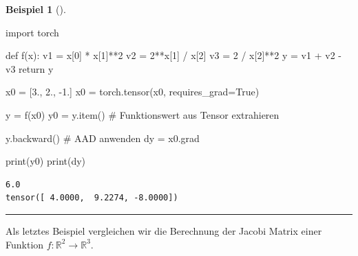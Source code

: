 \documentclass[
  a4paper,
  DIV=11]{scrreprt}
\newenvironment{Shaded}{\begin{snugshade}}{\end{snugshade}}
\newcommand{\BuiltInTok}[1]{\textcolor[rgb]{0.00,0.23,0.31}{#1}}
\newcommand{\CommentTok}[1]{\textcolor[rgb]{0.37,0.37,0.37}{#1}}
\newcommand{\ControlFlowTok}[1]{\textcolor[rgb]{0.00,0.23,0.31}{#1}}
\newcommand{\DecValTok}[1]{\textcolor[rgb]{0.68,0.00,0.00}{#1}}
\newcommand{\FloatTok}[1]{\textcolor[rgb]{0.68,0.00,0.00}{#1}}
\newcommand{\ImportTok}[1]{\textcolor[rgb]{0.00,0.46,0.62}{#1}}
\newcommand{\KeywordTok}[1]{\textcolor[rgb]{0.00,0.23,0.31}{#1}}
\newcommand{\NormalTok}[1]{\textcolor[rgb]{0.00,0.23,0.31}{#1}}
\newcommand{\OperatorTok}[1]{\textcolor[rgb]{0.37,0.37,0.37}{#1}}
\newcommand{\VariableTok}[1]{\textcolor[rgb]{0.07,0.07,0.07}{#1}}
\theoremstyle{definition}
\theoremstyle{definition}
\newtheorem{example}{Beispiel}[chapter]
\theoremstyle{remark}
\begin{document}
\begin{example}[]
\begin{Shaded}
\begin{Highlighting}[]
\ImportTok{import}\NormalTok{ torch}

\KeywordTok{def}\NormalTok{ f(x):}
\NormalTok{    v1 }\OperatorTok{=}\NormalTok{ x[}\DecValTok{0}\NormalTok{] }\OperatorTok{*}\NormalTok{ x[}\DecValTok{1}\NormalTok{]}\OperatorTok{**}\DecValTok{2}
\NormalTok{    v2 }\OperatorTok{=} \DecValTok{2}\OperatorTok{**}\NormalTok{x[}\DecValTok{1}\NormalTok{] }\OperatorTok{/}\NormalTok{ x[}\DecValTok{2}\NormalTok{]}
\NormalTok{    v3 }\OperatorTok{=} \DecValTok{2} \OperatorTok{/}\NormalTok{ x[}\DecValTok{2}\NormalTok{]}\OperatorTok{**}\DecValTok{2}
\NormalTok{    y }\OperatorTok{=}\NormalTok{ v1 }\OperatorTok{+}\NormalTok{ v2 }\OperatorTok{{-}}\NormalTok{ v3}
    \ControlFlowTok{return}\NormalTok{ y}

\NormalTok{x0 }\OperatorTok{=}\NormalTok{ [}\FloatTok{3.}\NormalTok{, }\FloatTok{2.}\NormalTok{, }\OperatorTok{{-}}\FloatTok{1.}\NormalTok{]}
\NormalTok{x0 }\OperatorTok{=}\NormalTok{ torch.tensor(x0, requires\_grad}\OperatorTok{=}\VariableTok{True}\NormalTok{)}

\NormalTok{y }\OperatorTok{=}\NormalTok{ f(x0)}
\NormalTok{y0 }\OperatorTok{=}\NormalTok{ y.item() }\CommentTok{\# Funktionswert aus Tensor extrahieren}

\NormalTok{y.backward()  }\CommentTok{\# AAD anwenden}
\NormalTok{dy }\OperatorTok{=}\NormalTok{ x0.grad}

\BuiltInTok{print}\NormalTok{(y0)}
\BuiltInTok{print}\NormalTok{(dy)}
\end{Highlighting}
\end{Shaded}

\begin{verbatim}
6.0
tensor([ 4.0000,  9.2274, -8.0000])
\end{verbatim}

\end{example}

\begin{center}\rule{0.5\linewidth}{0.5pt}\end{center}

Als letztes Beispiel vergleichen wir die Berechnung der Jacobi Matrix
einer Funktion \(f : \mathbb{R}^2 \rightarrow \mathbb{R}^3\).
\end{document}

